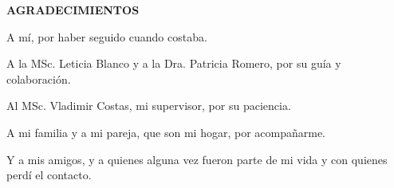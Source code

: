 \begin{center}
{\fontsize{14}{16}\selectfont\bfseries AGRADECIMIENTOS}
\end{center}

\vspace{1cm}
A mí, por haber seguido cuando costaba.

A la MSc. Leticia Blanco y a la Dra. Patricia Romero, por su guía y colaboración.

Al MSc. Vladimir Costas, mi supervisor, por su paciencia.

A mi familia y a mi pareja, que son mi hogar, por acompañarme.

Y a mis amigos, y a quienes alguna vez fueron parte de mi vida y con quienes perdí el contacto.
\newpage
